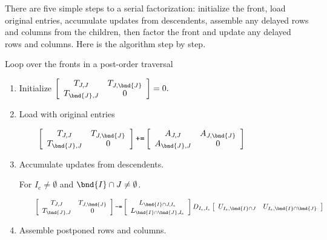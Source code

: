 \par \bigskip \par
{}
\par \bigskip \par
There are five simple steps to a serial factorization:
initialize the front, load original entries, accumulate updates
from descendents, assemble any delayed rows and columns from the
children, then factor the front and update any delayed rows and
columns. 
Here is the algorithm step by step.
\par
\noindent Loop over the fronts in a post-order traversal
\begin{enumerate}
\item
Initialize 
$\displaystyle
\left \lbrack \begin{array}{cc}
T_{J,J} & T_{J, \bnd{J}} \\
T_{\bnd{J},J} & 0
\end{array} \right \rbrack
= 0.
$
\item
Load with original entries 
\par
$\displaystyle
\mbox{\qquad} 
\left \lbrack \begin{array}{cc}
T_{J,J} & T_{J, \bnd{J}} \\
T_{\bnd{J},J} & 0
\end{array} \right \rbrack
\mbox{\tt +=}
\left \lbrack \begin{array}{cc}
A_{J,J} & A_{J, \bnd{J}} \\
A_{\bnd{J},J} & 0
\end{array} \right \rbrack
$
\item
Accumulate updates from descendents.
\par
For $I_e \ne \emptyset$ and $\bnd{I} \cap J \ne \emptyset$.
\par
$\mbox{\qquad}\displaystyle
\left \lbrack \begin{array}{cc}
T_{J,J} & T_{J, \bnd{J}} \\
T_{\bnd{J},J} & 0
\end{array} \right \rbrack
\mbox{\tt -=}
\left \lbrack \begin{array}{c}
L_{\bnd{I}\cap J,I_e} \\
L_{\bnd{I}\cap \bnd{J},I_e} 
\end{array} \right \rbrack
D_{I_e,I_e}
\left \lbrack \begin{array}{cc}
U_{I_e, \bnd{I} \cap J} & U_{I_e, \bnd{I}\cap \bnd{J}} 
\end{array} \right \rbrack
$
\item
Assemble postponed rows and columns.

\end{enumerate}
